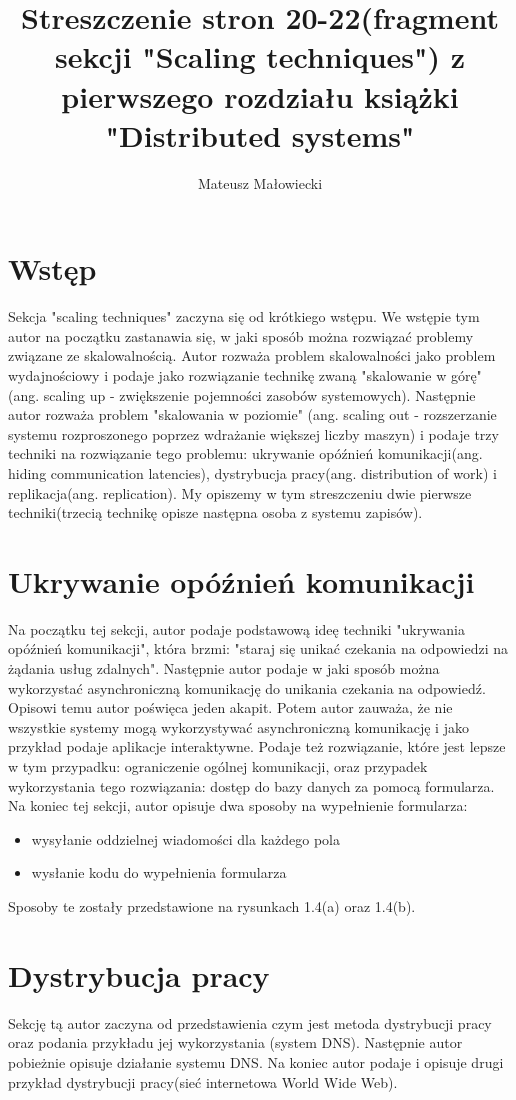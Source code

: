 \documentclass[10pt, a4paper]{article}
\title{Streszczenie stron 20-22(fragment sekcji "Scaling techniques") z pierwszego rozdziału książki "Distributed systems"}
\author{Mateusz Małowiecki}
\begin{document}
\maketitle
\section*{Wstęp}
Sekcja "scaling techniques" zaczyna się od krótkiego wstępu. We wstępie tym autor na początku zastanawia się, w jaki sposób można rozwiązać problemy związane ze skalowalnością. Autor rozważa problem skalowalności jako problem wydajnościowy i podaje jako rozwiązanie technikę zwaną "skalowanie w górę" (ang. scaling up - zwiększenie pojemności zasobów systemowych). Następnie autor rozważa problem "skalowania w poziomie" (ang. scaling out - rozszerzanie systemu rozproszonego poprzez wdrażanie większej liczby maszyn) i podaje trzy techniki na rozwiązanie tego problemu: ukrywanie opóźnień komunikacji(ang. hiding communication latencies), dystrybucja pracy(ang. distribution of work) i replikacja(ang. replication). My opiszemy w tym streszczeniu dwie pierwsze techniki(trzecią technikę opisze następna osoba z systemu zapisów).
\section*{Ukrywanie opóźnień komunikacji}
Na początku tej sekcji, autor podaje podstawową ideę techniki "ukrywania opóźnień komunikacji", która brzmi: "staraj się unikać czekania na odpowiedzi na żądania usług zdalnych". Następnie autor podaje w jaki sposób można wykorzystać asynchroniczną komunikację do unikania czekania na odpowiedź. Opisowi temu autor poświęca jeden akapit. Potem autor zauważa, że nie wszystkie systemy mogą wykorzystywać asynchroniczną komunikację i jako przykład podaje aplikacje interaktywne. Podaje też rozwiązanie, które jest lepsze w tym przypadku: ograniczenie ogólnej komunikacji, oraz przypadek wykorzystania tego rozwiązania: dostęp do bazy danych za pomocą formularza. Na koniec tej sekcji, autor opisuje dwa sposoby na wypełnienie formularza: 
\begin{itemize}
\item wysyłanie oddzielnej wiadomości dla każdego pola 
\item wysłanie kodu do wypełnienia formularza
\end{itemize}
Sposoby te zostały przedstawione na rysunkach 1.4(a) oraz 1.4(b).
\section*{Dystrybucja pracy}
Sekcję tą autor zaczyna od przedstawienia czym jest metoda dystrybucji pracy oraz podania przykładu jej wykorzystania (system DNS). Następnie autor pobieżnie opisuje działanie systemu DNS. Na koniec autor podaje i opisuje drugi przykład dystrybucji pracy(sieć internetowa World Wide Web).
\end{document}

